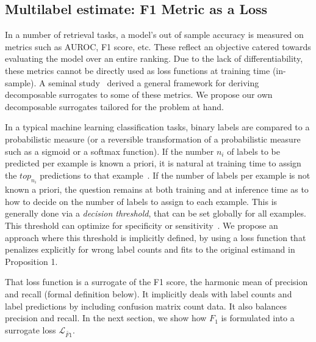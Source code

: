 \subsection{Multilabel estimate: F1 Metric as a Loss}
\label{section:background:metricsAsLosses}


In a number of retrieval tasks, a model's out of sample accuracy is measured on metrics such as AUROC, F1 score, etc. These reflect an objective catered towards evaluating the model over an entire ranking. Due to the lack of differentiability, these metrics cannot be directly used as loss functions at training time (in-sample). A seminal study~\cite{optimizableLosses} derived a general framework for deriving decomposable surrogates to some of these metrics. We propose our own decomposable surrogates tailored for the problem at hand.

In a typical machine learning classification tasks, binary labels are compared to a probabilistic measure (or a reversible
transformation of a probabilistic measure such as a sigmoid or a softmax
function). If the number $n_i$ of labels to be predicted per
example is known a priori, it is natural at training time to assign the $top_{n_i}$ predictions
to that example~\cite{lossTopKError, topKmulticlassSVM}. If the number of
labels per example is not known a priori, the question remains at both training and at inference time
as to how to decide on the number of labels to assign to each
example. This is generally done via a \emph{decision threshold}, that can be set globally for all
examples. This threshold can optimize for specificity or
sensitivity~\cite{decisionThreshold}. We propose an approach where this threshold is implicitly defined, by using a loss function that penalizes explicitly for wrong label counts and fits to the original estimand in Proposition 1.

That loss function is a surrogate of the F1 score, the harmonic mean of precision and recall (formal definition below). It implicitly deals with label counts and label predictions by including confusion matrix count data. It also balances precision and recall. In the next section, we show how $F_1$ is formulated into a surrogate loss $\mathcal{L}_{\widetilde{\mathit{F1}}}$.




